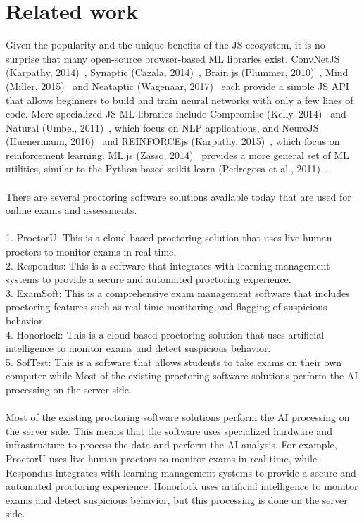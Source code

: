 \documentclass[journal]{IEEEtran}
\begin{document}
\section{Related work}
Given the popularity and the unique benefits of the JS ecosystem, it is no surprise that many open-source browser-based ML libraries exist. ConvNetJS (Karpathy, 2014)~\cite{1}, Synaptic (Cazala, 2014)~\cite{2}, Brain.js (Plummer, 2010)~\cite{3}, Mind (Miller, 2015)~\cite{4} and Neataptic (Wagenaar, 2017)~\cite{5} each provide a simple JS API that allows beginners to build and train neural networks with only a few lines of code. More specialized JS ML libraries include Compromise (Kelly, 2014)~\cite{6} and Natural (Umbel, 2011)~\cite{7}, which focus on NLP applications, and NeuroJS (Huenermann, 2016)~\cite{8} and REINFORCEjs (Karpathy, 2015)~\cite{9}, which focus on reinforcement learning. ML.js (Zasso, 2014)~\cite{10} provides a more general set of ML utilities, similar to the Python-based scikit-learn (Pedregosa et al., 2011)~\cite{11}.\\\\
There are several proctoring software solutions available today that are used for online
exams and assessments.\\\\
1. ProctorU: This is a cloud-based proctoring solution that uses live human proctors to
monitor exams in real-time.\\
2. Respondus: This is a software that integrates with learning management systems to
provide a secure and automated proctoring experience.\\
3. ExamSoft: This is a comprehensive exam management software that includes
proctoring features such as real-time monitoring and flagging of suspicious
behavior.\\
4. Honorlock: This is a cloud-based proctoring solution that uses artificial intelligence
to monitor exams and detect suspicious behavior.\\
5. SofTest: This is a software that allows students to take exams on their own
computer while Most of the existing proctoring software solutions perform the AI
processing on the server side.\\\\
Most of the existing proctoring software solutions perform the AI processing on the
server side. This means that the software uses specialized hardware and infrastructure to process the data and perform the AI analysis. For example, ProctorU uses live
human proctors to monitor exams in real-time, while Respondus integrates with learning
management systems to provide a secure and automated proctoring experience.
Honorlock uses artificial intelligence to monitor exams and detect suspicious behavior,
but this processing is done on the server side.\\
\end{document}

